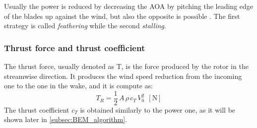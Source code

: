 Usually the power is reduced by decreasing the \acrshort{AOA} by pitching the leading edge of the blades up against the wind, but also the opposite is possible \cite{Aerodynamics_of_wind_turbines}. The first strategy is called \textit{feathering} while the second \textit{stalling}.

\subsubsection{Thrust force and thrust coefficient}
The thrust force, usually denoted as T, is the force produced by the rotor in the streamwise direction. It produces the wind speed reduction from the incoming one to the one in the wake, and it is compute as:
\begin{equation}
    T_R = \frac{1}{2} \, A \, \rho \, c_T \, V_0^2 \ \ \left[\si{\newton}\right]
    \label{eq:thrust_coeff}
\end{equation}
The thrust coefficient $c_T$ is obtained similarly to the power one, as it will be shown later in \autoref{subsec:BEM_algorithm}.

